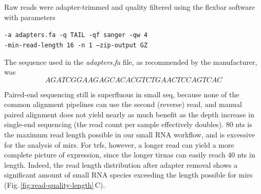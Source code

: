 \begin{method}

Raw reads were adapter-trimmed and quality filtered using the flexbar software\cite{Roehr2017} with parameters

\begin{center}\texttt{-a adapters.fa -q TAIL -qf sanger -qw 4 \\-min-read-length 16 -n 1 --zip-output GZ}\end{center} 

The sequence used in the \textit{adapters.fa} file, as recommended by the manufacturer, was $$AGATCGGAAGAGCACACGTCTGAACTCCAGTCAC$$ 

Paired-end sequencing still is superfluous in small \ac{seq}, because none of the common alignment pipelines can use the second (reverse) read, and manual paired alignment does not yield nearly as much benefit as the depth increase in single-end sequencing (the read count per sample effectively doubles). 80 \acp{nt} is the maximum read length possible in our small RNA workflow, and is excessive for the analysis of \acp{mir}. For \aclp{trf}, however, a longer read can yield a more complete picture of expression, since the longer \acp{tirna} can easily reach 40 \acp{nt} in length. Indeed, the read length distribution after adapter removal shows a significant amount of small RNA species exceeding the length possible for \acp{mir} (Fig.\,\ref{fig:read-quality-length}\,C). 

\end{method}


